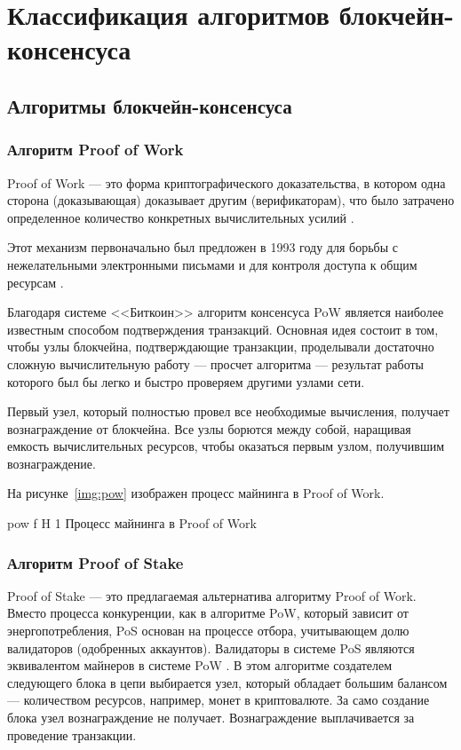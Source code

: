 \documentclass{bmstu}
\begin{document}
\chapter{Классификация алгоритмов блокчейн-консенсуса}

\section{Алгоритмы блокчейн-консенсуса}

\subsection{Алгоритм Proof of Work}

Proof of Work --- это форма криптографического доказательства, в котором одна сторона (доказывающая) доказывает другим (верификаторам), что было затрачено определенное количество конкретных вычислительных усилий \cite{Lachtar2020}.

Этот механизм первоначально был предложен в 1993 году для борьбы с нежелательными электронными письмами и для контроля доступа к общим ресурсам \cite{Dwork1982}.

Благодаря системе <<Биткоин>> алгоритм консенсуса PoW является наиболее известным способом подтверждения транзакций. 
Основная идея состоит в том, чтобы узлы блокчейна, подтверждающие транзакции, проделывали достаточно сложную вычислительную работу --- просчет алгоритма --- результат работы которого был бы легко и быстро проверяем другими узлами сети.

Первый узел, который полностью провел все необходимые вычисления, получает вознаграждение от блокчейна. 
Все узлы борются между собой, наращивая емкость вычислительных ресурсов, чтобы оказаться первым узлом, получившим вознаграждение.

На рисунке~\ref{img:pow} изображен процесс майнинга в Proof of Work.

    {pow}
    {f}
    {H}
    {1\textwidth}
    {Процесс майнинга в Proof of Work \cite{Auhl2022}}

\subsection{Алгоритм Proof of Stake}

Proof of Stake --- это предлагаемая альтернатива алгоритму Proof of Work. 
Вместо процесса конкуренции, как в алгоритме PoW, который зависит от энергопотребления, PoS основан на процессе отбора, учитывающем долю валидаторов (одобренных аккаунтов). 
Валидаторы в системе PoS являются эквивалентом майнеров в системе PoW \cite[361]{Azbeg2020}.
В этом алгоритме создателем следующего блока в цепи выбирается узел, который обладает большим балансом --- количеством ресурсов, например, монет в криптовалюте. 
За само создание блока узел вознаграждение не получает. 
Вознаграждение выплачивается за проведение транзакции.
\end{document}
